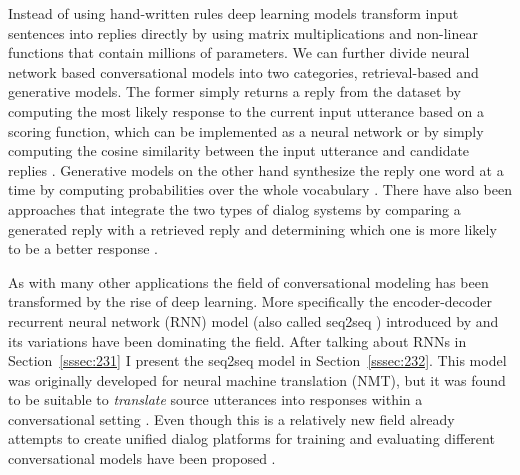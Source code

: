 \documentclass[12pt]{article}
\begin{document}
Instead of using hand-written rules deep learning models transform input sentences into replies directly by using matrix multiplications and non-linear functions that contain millions of parameters. We can further divide neural network based conversational models into two categories, retrieval-based and generative models. The former simply returns a reply from the dataset by computing the most likely response to the current input utterance based on a scoring function, which can be implemented as a neural network \cite{Cho:2014} or by simply computing the cosine similarity between the input utterance and candidate replies \cite{stalemate:2016}. Generative models on the other hand synthesize the reply one word at a time by computing probabilities over the whole vocabulary \cite{Sutskever:2014,Vinyals:2015}. There have also been approaches that integrate the two types of dialog systems by comparing a generated reply with a retrieved reply and determining which one is more likely to be a better response \cite{Song:2016}.

As with many other applications the field of conversational modeling has been transformed by the rise of deep learning. More specifically the encoder-decoder recurrent neural network (RNN) model (also called seq2seq \cite{Sutskever:2014}) introduced by \cite{Cho:2014} and its variations have been dominating the field. After talking about RNNs in Section~\ref{sssec:231} I present the seq2seq model in Section~\ref{sssec:232}. This model was originally developed for neural machine translation (NMT), but it was found to be suitable to \textit{translate} source utterances into responses within a conversational setting \cite{Shang:2015,Vinyals:2015}. Even though this is a relatively new field already attempts to create unified dialog platforms for training and evaluating different conversational models have been proposed \cite{Miller:2017}.
\end{document}
